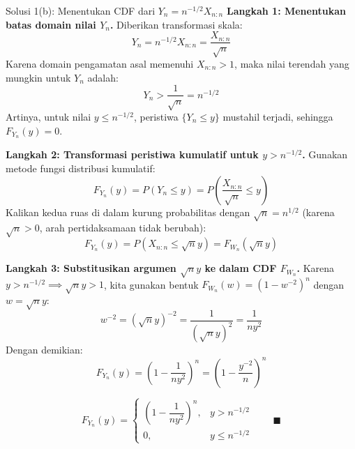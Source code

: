 \documentclass[10pt,twoside]{article}
\begin{document}
\begin{solbox}{Solusi 1(b): Menentukan CDF dari $Y_n = n^{-1/2} X_{n:n}$}
\textbf{Langkah 1: Menentukan batas domain nilai $Y_n$.}
Diberikan transformasi skala:
\[
Y_n = n^{-1/2} X_{n:n} = \frac{X_{n:n}}{\sqrt{n}}
\]
Karena domain pengamatan asal memenuhi $X_{n:n} > 1$, maka nilai terendah yang mungkin untuk $Y_n$ adalah:
\[
Y_n > \frac{1}{\sqrt{n}} = n^{-1/2}
\]
Artinya, untuk nilai $y \le n^{-1/2}$, peristiwa $\{Y_n \le y\}$ mustahil terjadi, sehingga $F_{Y_n}(y) = 0$.

\textbf{Langkah 2: Transformasi peristiwa kumulatif untuk $y > n^{-1/2}$.}
Gunakan metode fungsi distribusi kumulatif:
\[
F_{Y_n}(y) = P(Y_n \le y) = P\left(\frac{X_{n:n}}{\sqrt{n}} \le y\right)
\]
Kalikan kedua ruas di dalam kurung probabilitas dengan $\sqrt{n} = n^{1/2}$ (karena $\sqrt{n} > 0$, arah pertidaksamaan tidak berubah):
\[
F_{Y_n}(y) = P\left(X_{n:n} \le \sqrt{n} y\right) = F_{W_n}\left(\sqrt{n} y\right)
\]

\textbf{Langkah 3: Substitusikan argumen $\sqrt{n} y$ ke dalam CDF $F_{W_n}$.}
Karena $y > n^{-1/2} \implies \sqrt{n} y > 1$, kita gunakan bentuk $F_{W_n}(w) = (1 - w^{-2})^n$ dengan $w = \sqrt{n} y$:
\[
w^{-2} = \left(\sqrt{n} y\right)^{-2} = \frac{1}{\left(\sqrt{n} y\right)^2} = \frac{1}{n y^2}
\]
Dengan demikian:
\[
F_{Y_n}(y) = \left(1 - \frac{1}{n y^2}\right)^n = \left(1 - \frac{y^{-2}}{n}\right)^n
\]

\[
\boxed{F_{Y_n}(y) = \begin{cases} \left(1 - \dfrac{1}{n y^2}\right)^n, & y > n^{-1/2} \\ 0, & y \le n^{-1/2} \end{cases}} \qquad \blacksquare
\]
\end{solbox}
\end{document}
